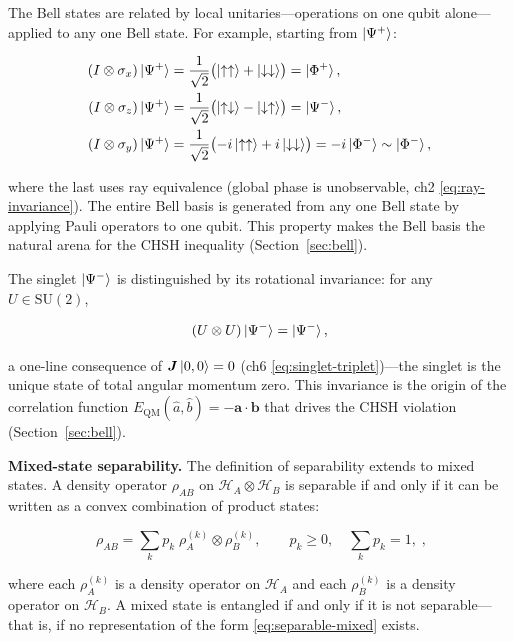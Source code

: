 The Bell states are related by local unitaries---operations on one qubit alone---applied to any one Bell state. For example, starting from $\ket{\Psi^+}$:
\begin{linenomath}
\begin{align}
(I \otimes \sigma_x)\ket{\Psi^+} &= \frac{1}{\sqrt{2}}\bigl(\ket{\uparrow\uparrow} + \ket{\downarrow\downarrow}\bigr) = \ket{\Phi^+}, \\
(I \otimes \sigma_z)\ket{\Psi^+} &= \frac{1}{\sqrt{2}}\bigl(\ket{\uparrow\downarrow} - \ket{\downarrow\uparrow}\bigr) = \ket{\Psi^-}, \\
(I \otimes \sigma_y)\ket{\Psi^+} &= \frac{1}{\sqrt{2}}\bigl(-i\ket{\uparrow\uparrow} + i\ket{\downarrow\downarrow}\bigr) = -i\ket{\Phi^-} \sim \ket{\Phi^-},
\end{align}
\end{linenomath}
where the last uses ray equivalence (global phase is unobservable, ch2 \eqref{eq:ray-invariance}). The entire Bell basis is generated from any one Bell state by applying Pauli operators to one qubit. This property makes the Bell basis the natural arena for the CHSH inequality (Section~\ref{sec:bell}).

The singlet $\ket{\Psi^-}$ is distinguished by its rotational invariance: for any $U \in \mathrm{SU}(2)$,
\begin{linenomath}
\begin{equation}
(U \otimes U)\ket{\Psi^-} = \ket{\Psi^-},
\end{equation}
\end{linenomath}
a one-line consequence of $\bm J \ket{0,0} = 0$ (ch6 \eqref{eq:singlet-triplet})---the singlet is the unique state of total angular momentum zero. This invariance is the origin of the correlation function $E_{\text{QM}}(\hat{a},\hat{b}) = -\bm a\cdot\bm b$ that drives the CHSH violation (Section~\ref{sec:bell}).

\medskip\noindent\textbf{Mixed-state separability.}
The definition of separability extends to mixed states. A density operator $\rho_{AB}$ on $\mathcal{H}_A \otimes \mathcal{H}_B$ is separable if and only if it can be written as a convex combination of product states:
\begin{linenomath}
\begin{equation}
\boxed{\;
\rho_{AB} = \sum_k p_k \; \rho_A^{(k)} \otimes \rho_B^{(k)},
\qquad
p_k \ge 0,\quad \sum_k p_k = 1,
\;},
\label{eq:separable-mixed}
\end{equation}
\end{linenomath}
where each $\rho_A^{(k)}$ is a density operator on $\mathcal{H}_A$ and each $\rho_B^{(k)}$ is a density operator on $\mathcal{H}_B$. A mixed state is entangled if and only if it is not separable---that is, if no representation of the form \eqref{eq:separable-mixed} exists.

